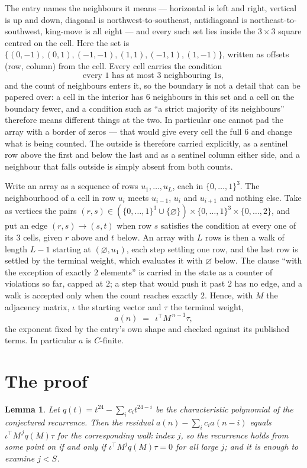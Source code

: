 \documentclass[11pt,a4paper]{article}
\theoremstyle{plain}
\newtheorem{lemma}[theorem]{Lemma}
\theoremstyle{definition}
\begin{document}
The entry names the neighbours it means --- horizontal is left and right, vertical is up and
down, diagonal is northwest-to-southeast, antidiagonal is northeast-to-southwest, king-move is
all eight --- and every such set lies inside the $3\times3$ square centred on the cell. Here
the set is $\{(0,-1), (0,1), (-1,-1), (1,1), (-1,1), (1,-1)\}$, written as offsets (row, column) from the cell. Every cell carries
the condition
\[
\text{every 1 has at most 3 neighbouring 1s},
\]
and the count of neighbours enters it, so the boundary is not a detail that can be papered
over: a cell in the interior has $6$ neighbours in this set and a cell on the boundary
fewer, and a condition such as ``a strict majority of its neighbours'' therefore means
different things at the two. In particular one cannot pad the array with a border of zeros ---
that would give every cell the full $6$ and change what is being counted. The outside is
therefore carried
explicitly, as a sentinel row above the first and below the last and as a sentinel column
either side, and a neighbour that falls outside is simply absent from both counts.

Write an array as a sequence of rows $u_1,\dots,u_L$, each in
$\{0,\dots,1\}^{3}$. The neighbourhood of a cell in row $u_i$ meets $u_{i-1}$,
$u_i$ and $u_{i+1}$ and nothing else. Take as vertices the pairs
$(r,s)\in(\{0,\dots,1\}^{3}\cup\{\varnothing\})\times\{0,\dots,1\}^{3} \times \{0,\dots,2\}$,
and put an edge $(r,s)\to(s,t)$ when row $s$ satisfies the condition at every one of its
$3$ cells, given $r$ above and $t$ below. An array with $L$ rows is then a walk of length
$L-1$ starting at $(\varnothing,u_1)$, each step settling one row, and the last row is
settled by the terminal weight, which evaluates it with $\varnothing$ below. The clause ``with the exception of exactly $2$ elements'' is carried in
the state as a counter of violations so far, capped at $2$; a step that would push it past
$2$ has no edge, and a walk is accepted only when the count reaches exactly $2$. Hence,
with $M$ the adjacency matrix, $\iota$ the starting vector and $\tau$ the terminal weight,
\[
a(n)\;=\;\,\iota^{\!\top}M^{\,n-1}\tau ,
\]
the exponent fixed by the entry's own shape and checked against its published terms. In
particular $a$ is $C$-finite.

\section{The proof}

\begin{lemma}\label{lem:crit}
Let $q(t)=t^{24}-\sum_i c_it^{24-i}$ be the characteristic polynomial of the
conjectured recurrence. Then the residual $a(n)-\sum_ic_ia(n-i)$ equals
$\iota^{\!\top}M^{\,j}q(M)\tau$ for the corresponding walk index $j$, so the
recurrence holds from some point on if and only if $\iota^{\!\top}M^{j}q(M)\tau=0$ for all
large $j$; and it is enough to examine $j<S$.
\end{lemma}
\end{document}
